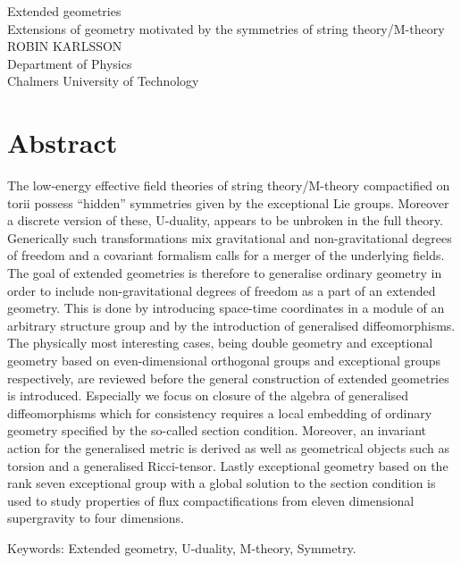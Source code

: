 Extended geometries\\
Extensions of geometry motivated by the symmetries of string theory/M-theory\\
ROBIN KARLSSON\\
Department of Physics\\
Chalmers University of Technology \setlength{\parskip}{0.5cm}

\thispagestyle{plain}			%
\setlength{\parskip}{0pt plus 1.0pt}
\section*{Abstract}
The low-energy effective field theories of string theory/M-theory compactified on torii possess ``hidden'' symmetries given by the exceptional Lie groups. Moreover a discrete version of these, U-duality, appears to be unbroken in the full theory. Generically such transformations mix gravitational and non-gravitational degrees of freedom and a covariant formalism calls for a merger of the underlying fields. The goal of extended geometries is therefore to generalise ordinary geometry in order to include non-gravitational degrees of freedom as a part of an extended geometry. This is done by introducing space-time coordinates in a module of an arbitrary structure group and by the introduction of generalised diffeomorphisms. The physically most interesting cases, being double geometry and exceptional geometry based on even-dimensional orthogonal groups and exceptional groups respectively, are reviewed before the general construction of extended geometries is introduced. Especially we focus on closure of the algebra of generalised diffeomorphisms which for consistency requires a local embedding of ordinary geometry specified by the so-called section condition. Moreover, an invariant action for the generalised metric is derived as well as geometrical objects such as torsion and a generalised Ricci-tensor. Lastly exceptional geometry based on the rank seven exceptional group with a global solution to the section condition is used to study properties of flux compactifications from eleven dimensional supergravity to four dimensions. 




\vfill
Keywords: Extended geometry, U-duality, M-theory, Symmetry.

\newpage				%
\thispagestyle{empty}
\mbox{}